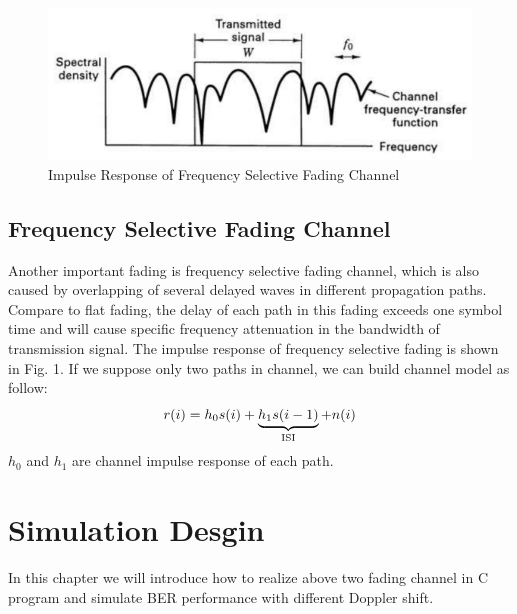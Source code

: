 \documentclass[technicalreport]{ieicej}
\begin{document}
\begin{figure}[H]
	\begin{center}
		\vspace{0cm}
		\includegraphics[width=\linewidth,clip]{fig/select_fading_illustrate.pdf}
		\caption{Impulse Response of Frequency Selective Fading Channel}
		\label{fig:sample}
	\end{center}
\end{figure}

\subsection{Frequency Selective Fading Channel}
Another important fading is frequency selective fading channel, which is also caused by overlapping of several delayed waves in different propagation paths. Compare to flat fading, the delay of each path in this fading exceeds one symbol time and will cause specific frequency attenuation in the bandwidth of transmission signal. The impulse response of frequency selective fading is shown in Fig. 1. If we suppose only two paths in channel, we can build channel model as follow:
\begin{equation}
r(i)=h_0s(i)+\underbrace{h_1s(i-1)}_{\rm ISI}+n(i)
\end{equation}
$h_0$ and $h_1$ are channel impulse response of each path.

\section{Simulation Desgin}
In this chapter we will introduce how to realize above two fading channel in C program and simulate BER performance with different Doppler shift.
\end{document}
